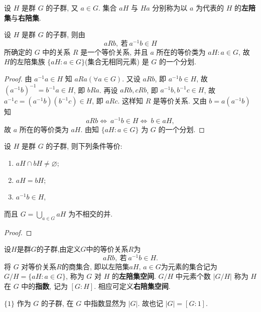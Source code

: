 \documentclass[../../main.tex]{subfiles}
\begin{document}
\begin{definition}
设 \( H \) 是群 \( G \) 的子群, 又 \( a \in G \). 集合 \( aH \) 与 \( Ha \) 分别称为以 \( a \) 为代表的 \( H \) 的\textbf{左陪集}与\textbf{右陪集}.
\end{definition}

\begin{theorem}\label{theorem:抽象代数-定理 1.3.2}
设 \( H \) 是群 \( G \) 的子群, 则由
\[
aRb, \ \text{若} \ a^{-1}b \in H
\]
所确定的 \( G \) 中的关系 \( R \) 是一个等价关系, 并且 \( a \) 所在的等价类为 \( aH:a\in G \), 故 \( H \)的左陪集族 \( \{aH:a\in G\} \)(集合无相同元素) 是 \( G \) 的一个分划.
\end{theorem}
\begin{proof}
由 \( a^{-1}a \in H \) 知 \( aRa(\forall a \in G) \). 又设 \( aRb \), 即 \( a^{-1}b \in H \), 故 \( (a^{-1}b)^{-1} = b^{-1}a \in H \), 即 \( bRa \). 再设 \( aRb, cRb \), 即 \( a^{-1}b, b^{-1}c \in H \), 故 \( a^{-1}c = (a^{-1}b)(b^{-1}c) \in H \), 即 \( aRc \). 这样知 \( R \) 是等价关系. 又由 \( b = a(a^{-1}b) \) 知
\[
aRb \iff \ a^{-1}b \in H \iff \ b \in aH,
\]
故 \( a \) 所在的等价类为 \( aH \). 由知 \( \{aH:a\in G\} \) 为 \( G \) 的一个分划.

\end{proof}

\begin{corollary}\label{corollary:抽象代数-推论 1.3.3}
设 \( H \) 是群 \( G \) 的子群, 则下列条件等价:
\begin{enumerate}[(1)]
\item \( aH \cap bH \neq \varnothing \);

\item \( aH = bH \);

\item \( a^{-1}b \in H \),
\end{enumerate}
而且 \( G = \bigcup\limits_{a \in G} aH \) 为不相交的并.
\end{corollary}
\begin{proof}


\end{proof}

\begin{definition}
设$H$是群$G$的子群,由定义$G$中的等价关系$R$为
\[
aRb, \ \text{若} \ a^{-1}b \in H.
\]
将 \( G \) 对等价关系$R$的商集合, 即以左陪集$aH,\,a\in G$为元素的集合记为 \( G/H=\{aH:a\in G\} \), 称为 \( G \) 对 \( H \) 的\textbf{左陪集空间}. \( G/H \) 中元素个数 \( |G/H| \) 称为 \( H \) 在 \( G \) 中的\textbf{指数}, 记为 \( [G:H] \). 相应可定义\textbf{右陪集空间}.
\end{definition}
\begin{remark}
\(\{1\}\) 作为 \( G \) 的子群, 在 \( G \) 中指数显然为 \( |G| \). 故也记 \( |G| = [G: 1] \).
\end{remark}
\end{document}
